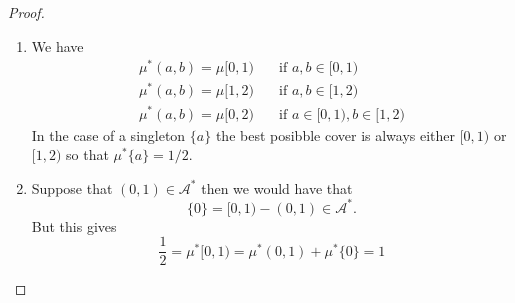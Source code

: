 \begin{proof}

\begin{enumerate}
  \item We have
\begin{align*}
\mu ^*(a,b)=\mu [0,1) \quad &\text{if } a,b\in [0,1)\\
\mu ^*(a,b)=\mu [1,2) \quad &\text{if } a,b\in [1,2)\\
\mu ^*(a,b)=\mu [0,2) \quad &\text{if } a\in [0,1),b\in [1,2)
\end{align*}
In the case of a singleton \(\{a\}\) the best posibble cover is always either \([0,1)\) or \([1,2)\) so that \(\mu ^*\{a\}=1/2.\)
  \item Suppose that \((0,1)\in \mathcal{A}^*\) then we would have that \[\{0\}=[0,1)-(0,1)\in \mathcal{A}^*.\] But this gives
\[
\frac{1}{2}=\mu ^*[0,1)=\mu ^*(0,1)+\mu ^*\{0\}=1
\]

\end{enumerate}

\end{proof}


